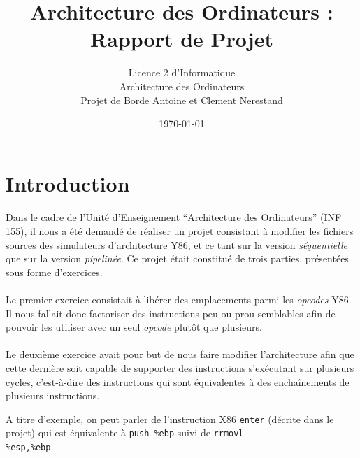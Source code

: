 \documentclass[12pt]{article}
\title{Architecture des Ordinateurs : Rapport de Projet}
\author{Licence 2 d'Informatique\\ 
  Architecture des Ordinateurs\\
  Projet de Borde Antoine et Clement Nerestand}
\date{\today}
\begin{document}
\maketitle

\vspace{5\baselineskip}

\newpage

\tableofcontents
\newpage

\section*{Introduction}
\paragraph{}Dans le cadre de l'Unité d'Enseignement ``Architecture des Ordinateurs'' (INF 155), il nous a été demandé de réaliser un projet consistant à modifier les fichiers sources des simulateurs d'architecture Y86, et ce tant sur la version {\itshape séquentielle} que sur la version {\itshape pipelinée}. Ce projet était constitué de trois parties, présentées sous forme d'exercices.

\paragraph{}Le premier exercice consistait à libérer des emplacements parmi les {\itshape opcodes} Y86. Il nous fallait donc factoriser des instructions peu ou prou semblables afin de pouvoir les utiliser avec un seul {\itshape opcode} plutôt que plusieurs.

\paragraph{}Le deuxième exercice avait pour but de nous faire modifier l'architecture afin que cette dernière soit capable de supporter des instructions s'exécutant sur plusieurs cycles, c'est-à-dire des instructions qui sont équivalentes à des enchaînements de plusieurs instructions.

A titre d'exemple, on peut parler de l'instruction X86 \verb+enter+ (décrite dans le projet) qui est équivalente à \verb+push %ebp+ suivi de \verb+rrmovl+\\ \verb+%esp,%ebp+.
\end{document}
